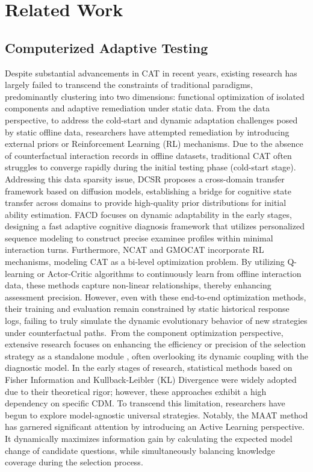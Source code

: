


\section{Related Work}

\subsection{Computerized Adaptive Testing}
Despite substantial advancements in CAT in recent years, existing research has largely failed to transcend the constraints of traditional paradigms, predominantly clustering into two dimensions: functional optimization of isolated components and adaptive remediation under static data. From the data perspective, to address the cold-start and dynamic adaptation challenges posed by static offline data, researchers have attempted remediation by introducing external priors\cite{ma2025diffusion} or Reinforcement Learning (RL) mechanisms\cite{wang2023gmocat,yu2025light}. Due to the absence of counterfactual interaction records in offline datasets, traditional CAT often struggles to converge rapidly during the initial testing phase (cold-start stage). Addressing this data sparsity issue, DCSR\cite{ma2025diffusion} proposes a cross-domain transfer framework based on diffusion models, establishing a bridge for cognitive state transfer across domains to provide high-quality prior distributions for initial ability estimation. FACD\cite{liu2025fast} focuses on dynamic adaptability in the early stages, designing a fast adaptive cognitive diagnosis framework that utilizes personalized sequence modeling to construct precise examinee profiles within minimal interaction turns. Furthermore, NCAT \cite{zhuang2022fully} and GMOCAT \cite{wang2023gmocat} incorporate RL mechanisms, modeling CAT as a bi-level optimization problem\cite{ijcai2021p332}. By utilizing Q-learning or Actor-Critic algorithms to continuously learn from offline interaction data, these methods capture non-linear relationships, thereby enhancing assessment precision. However, even with these end-to-end optimization methods, their training and evaluation remain constrained by static historical response logs, failing to truly simulate the dynamic evolutionary behavior of new strategies under counterfactual paths.~From the component optimization perspective, extensive research focuses on enhancing the efficiency or precision of the selection strategy as a standalone module \cite{wang2025explicit,ma2025reconciling}, often overlooking its dynamic coupling with the diagnostic model. In the early stages of research, statistical methods based on Fisher Information \cite{lord2012applications} and Kullback-Leibler (KL) Divergence \cite{chang1996global} were widely adopted due to their theoretical rigor; however, these approaches exhibit a high dependency on specific CDM. To transcend this limitation, researchers have begun to explore model-agnostic universal strategies. Notably, the MAAT \cite{bi2020quality} method has garnered significant attention by introducing an Active Learning perspective. It dynamically maximizes information gain by calculating the expected model change of candidate questions, while simultaneously balancing knowledge coverage during the selection process.

